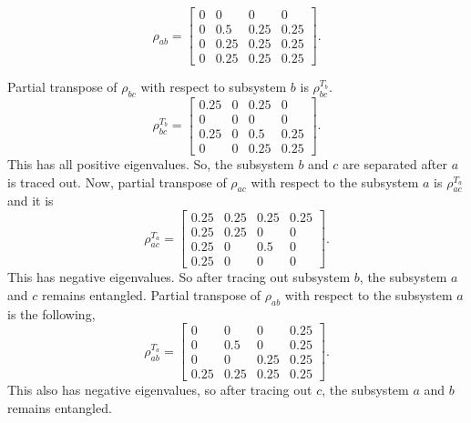 \documentclass{amsart}
\theoremstyle{plain}
\theoremstyle{definition}
\theoremstyle{plain}
\begin{document}
	\begin{equation*}
		\rho_{ab} = \left[\begin{matrix}0 & 0 & 0 & 0\\0 & 0.5 & 0.25 & 0.25\\0 & 0.25 & 0.25 & 0.25\\0 & 0.25 & 0.25 & 0.25\end{matrix}\right].
	\end{equation*}

	Partial transpose of $\rho_{bc}$ with respect to subsystem $b $ is $\rho^{T_b}_{bc}$.
	\begin{equation*}
		\rho^{T_b}_{bc} = \left[\begin{matrix}0.25 & 0 & 0.25 & 0\\0 & 0 & 0 & 0\\0.25 & 0 & 0.5 & 0.25\\0 & 0 & 0.25 & 0.25\end{matrix}\right].
	\end{equation*}
	This has all positive eigenvalues. So, the subsystem $b$ and $c$ are separated after $a$ is traced out. Now, partial transpose of $\rho_{ac}$ with respect to the subsystem $a$ is $\rho^{T_a}_{ac}$ and it is
	\begin{equation*}
		\rho^{T_a}_{ac} = \left[\begin{matrix}0.25 & 0.25 & 0.25 & 0.25\\0.25 & 0.25 & 0 & 0\\0.25 & 0 & 0.5 & 0\\0.25 & 0 & 0 & 0\end{matrix}\right].
	\end{equation*}
	This has negative eigenvalues. So after tracing out subsystem $b$, the subsystem $a$ and $c$ remains entangled.
	Partial transpose of $\rho_{ab}$ with respect to the subsystem $a$ is the following,
	\begin{equation*}
		\rho^{T_a}_{ab} = \left[\begin{matrix}0 & 0 & 0 & 0.25\\0 & 0.5 & 0 & 0.25\\0 & 0 & 0.25 & 0.25\\0.25 & 0.25 & 0.25 & 0.25\end{matrix}\right].
	\end{equation*}
	This also has negative eigenvalues, so after tracing out $c$, the subsystem $a$ and $b$ remains entangled.
\end{document}
